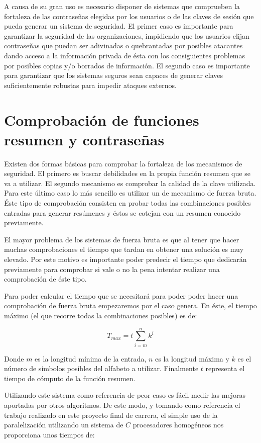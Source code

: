 A causa de su gran uso es necesario disponer de sistemas que comprueben la fortaleza de las contraseñas elegidas por los usuarios o de las claves de sesión que pueda generar un sistema de seguridad. El primer caso es importante para garantizar la seguridad de las organizaciones, impidiendo que los usuarios elijan contraseñas que puedan ser adivinadas o quebrantadas por posibles atacantes dando acceso a la información privada de ésta con los consiguientes problemas por posibles copias y/o borrados de información. El segundo caso es importante para garantizar que los sistemas seguros sean capaces de generar claves suficientemente robustas para impedir ataques externos.

\section{Comprobación de funciones resumen y contraseñas}

Existen dos formas básicas para comprobar la fortaleza de los mecanismos de seguridad. El primero es buscar debilidades en la propia función resumen que se va a utilizar. El segundo mecanismo es comprobar la calidad de la clave utilizada. Para este último caso lo más sencillo es utilizar un de mecanismo de fuerza bruta. Éste tipo de comprobación consisten en probar todas las combinaciones posibles entradas para generar resúmenes y éstos se cotejan con un resumen conocido previamente.

El mayor problema de los sistemas de fuerza bruta es que al tener que hacer muchas comprobaciones el tiempo que tardan en obtener una solución es muy elevado. Por este motivo es importante poder predecir el tiempo que dedicarán previamente para comprobar si vale o no la pena intentar realizar una comprobación de éste tipo.

Para poder calcular el tiempo que se necesitará para poder poder hacer una comprobación de fuerza bruta empezaremos por el caso genera. En éste, el tiempo máximo (el que recorre todas la combinaciones posibles) es de:

$$ T_{max}=t\sum^n_{i=m}k^i $$
 
Donde $m$ es la longitud mínima de la entrada, $n$ es la longitud máxima y $k$ es el número de símbolos posibles del alfabeto a utilizar. Finalmente $t$ representa el tiempo de cómputo de la función resumen.

Utilizando este sistema como referencia de peor caso es fácil medir las mejoras aportadas por otros algoritmos. De este modo, y tomando como referencia el trabajo realizado en este proyecto final de carrera, el simple uso de la paralelización utilizando un sistema de $C$ procesadores homogéneos nos proporciona unos tiempos de:

